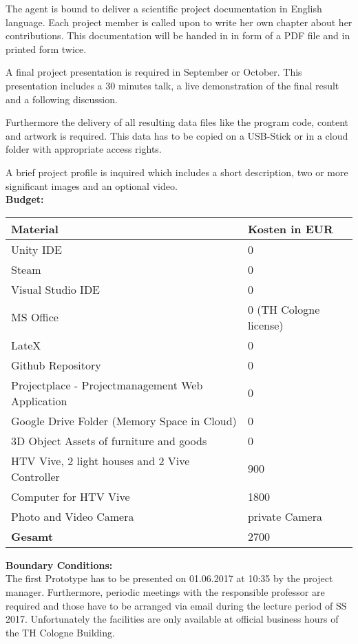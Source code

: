 \documentclass[a4paper, 12pt]{article}
\begin{document}
The agent is bound to deliver a scientific project documentation in English language. Each project member is called upon to write her own chapter about her contributions. This documentation will be handed in in form of a PDF file and in printed form twice. 

A final project presentation is required in September or October. This presentation includes a 30 minutes talk, a live demonstration of the final result and a following discussion.

Furthermore the delivery of all resulting data files like the program code, content and artwork is required. This data has to be copied on a USB-Stick or in a cloud folder with appropriate access rights.

A brief project profile is inquired which includes a short description, two or more significant images and an optional video.\\


\textbf{Budget:}\\

\begin{tabular}{| l | l |}
\hline
\textbf{Material} & \textbf{Kosten in EUR}\\\hline
 Unity IDE  & 0\\ \hline
 Steam  & 0\\ \hline
 Visual Studio IDE  & 0\\ \hline
 MS Office  & 0 (TH Cologne license)\\ \hline
LateX  & 0 \\ \hline
 Github Repository & 0\\ \hline
 Projectplace - Projectmanagement Web Application& 0\\ \hline
 Google Drive Folder (Memory Space in Cloud) & 0\\ \hline
 3D Object Assets of furniture and goods & 0\\ \hline
  HTV Vive, 2 light houses and 2 Vive Controller & 900\\  \hline
 Computer for HTV Vive  & 1800 \\ \hline
 Photo and Video Camera  & private Camera \\ \hline
 

 \textbf{Gesamt} & 2700\\
 \hline
\end{tabular}
\bigskip

\textbf{Boundary Conditions:}\\

The first Prototype has to be presented on 01.06.2017 at 10:35 by the project manager. Furthermore, periodic meetings with the responsible professor are required and those have to be arranged via email during the lecture period of SS 2017. Unfortunately the facilities are only available at official business hours of the TH Cologne Building. \\
\end{document}
